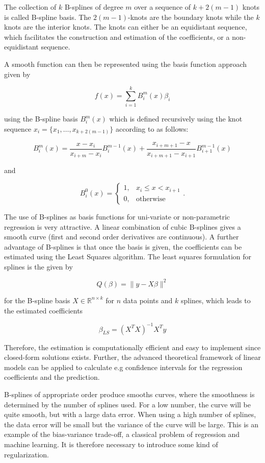 \documentclass[10pt,a4paper]{article}
\begin{document}
The collection of $k$ B-splines of degree $m$ over a sequence of $k+2(m-1)$ knots is called B-spline basis. The $2(m-1)$-knots are the boundary knots while the $k$ knots are the interior knots. The knots can either be an equidistant sequence, which facilitates the construction and estimation of the coefficients, or a non-equidistant sequence.

A smooth function can then be represented using the basis function approach given by

$$f(x) = \sum_{i=1}^k B_i^m(x) \beta_i $$

using the B-spline basis $B_i^m(x)$ which is defined recursively using the knot sequence $x_i = \{x_1, \dots, x_{k+2(m-1)}\}$ according to \cite{deBoor1978practicalGuideToSplines} as follows:

$$B_i^m(x) = \frac{x - x_i}{x_{i+m} - x_i} B_i^{m-1}(x) + \frac{x_{i+m+1} - x}{x_{i+m+1} - x_{i+1}} B_{i+1}^{m-1}(x)$$

and

$$B_i^0(x) = \begin{cases} 1, & x_i \le x < x_{i+1} \\ 0, & \text{otherwise} \end{cases}.$$

The use of B-splines as basis functions for uni-variate or non-parametric regression is very attractive. A linear combination of cubic B-splines gives a smooth curve (first and second order derivatives are continuous). A further advantage of B-splines is that once the basis is given, the coefficients can be estimated using the Least Squares algorithm. The least squares formulation for splines is the given by

$$Q(\beta) = \lVert y - X\beta\rVert^2$$

for the B-spline basis $X \in \mathbb{R}^{n \times k}$ for $n$ data points and $k$ splines, which leads to the estimated coefficients 

$$\beta_{LS} = (X^TX)^{-1}X^T y$$

Therefore, the estimation is computationally efficient and easy to implement since closed-form solutions exists. Further, the advanced theoretical framework of linear models can be applied to calculate e.g confidence intervals for the regression coefficients and the prediction.

B-splines of appropriate order  produce smooths curves, where the smoothness is determined by the number of splines used. For a low number, the curve will be quite smooth, but with a large data error. When using a high number of splines, the data error will be small but the variance of the curve will be large. This is an example of the bias-variance trade-off, a classical problem of regression and machine learning. It is therefore necessary to introduce some kind of regularization. \cite{deBoor1978practicalGuideToSplines}  
\end{document}
